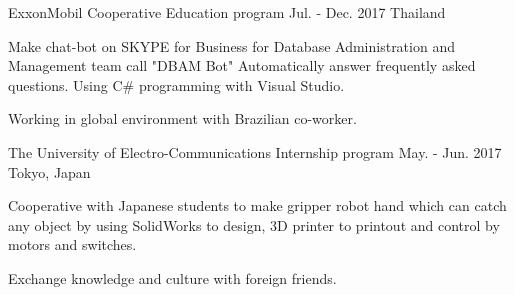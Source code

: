\begin{cventries}
  \cventry
    {ExxonMobil} %
    {Cooperative Education program} %
    {Jul. - Dec. 2017} %
    {Thailand} %
    {
      \begin{cvitems} %
        \item {Make chat-bot on SKYPE for Business for Database Administration and Management team call "DBAM Bot" Automatically answer frequently asked questions. Using C\# programming with Visual Studio.}
        \item {Working in global environment with Brazilian co-worker.}
      \end{cvitems}
    }

  \cventry
    {The University of Electro-Communications} %
    {Internship program} %
    {May. - Jun. 2017} %
    {Tokyo, Japan} %
    {
      \begin{cvitems} %
        \item {Cooperative with Japanese students to make gripper robot hand which can catch any object by using SolidWorks to design, 3D printer to printout and control by motors and switches.}
        \item {Exchange knowledge and culture with foreign friends.}
      \end{cvitems}
    }

\end{cventries}
